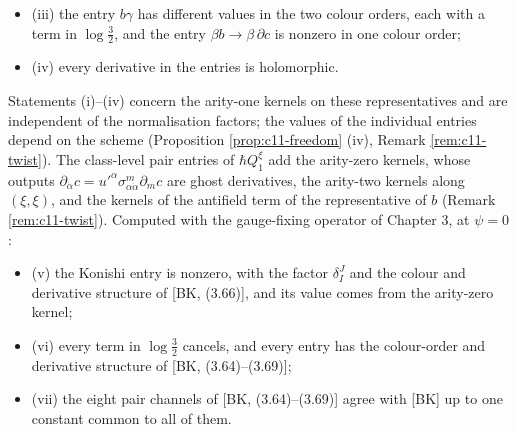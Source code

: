 \begin{theorem}
\begin{itemize}
\item (iii) the entry $b\gamma$ has different values in the two colour orders, each with a term in $\log\tfrac32$, and the entry $\beta b\to\beta\,\partial c$ is nonzero in one colour order;
\item (iv) every derivative in the entries is holomorphic.
\end{itemize}
Statements (i)--(iv) concern the arity-one kernels on these representatives and are independent of the normalisation factors; the values of the individual entries depend on the scheme (Proposition \ref{prop:c11-freedom} (iv), Remark \ref{rem:c11-twist}). The class-level pair entries of $\hbar Q^\xi_1$ add the arity-zero kernels, whose outputs $\partial_{\dot\alpha}c=u'^\alpha\sigma^m_{\alpha\dot\alpha}\partial_mc$ are ghost derivatives, the arity-two kernels along $(\xi,\xi)$, and the kernels of the antifield term of the representative of $b$ (Remark \ref{rem:c11-twist}). Computed with the gauge-fixing operator of Chapter 3, at $\psi=0$:
\begin{itemize}
\item (v) the Konishi entry is nonzero, with the factor $\delta^J_I$ and the colour and derivative structure of [BK, (3.66)], and its value comes from the arity-zero kernel;
\item (vi) every term in $\log\tfrac32$ cancels, and every entry has the colour-order and derivative structure of [BK, (3.64)--(3.69)];
\item (vii) the eight pair channels of [BK, (3.64)--(3.69)] agree with [BK] up to one constant common to all of them.
\end{itemize}
\end{theorem}

